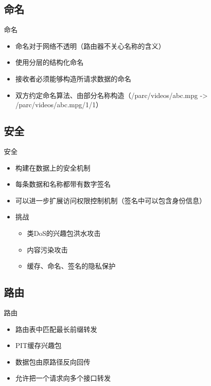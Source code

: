 \documentclass[mathserif]{beamer}
\begin{document}
\subsection{命名}
\begin{frame}{命名}
  \begin{itemize}
  \item 命名对于网络不透明（路由器不关心名称的含义）
  \item 使用分层的结构化命名
  \item 接收者必须能够构造所请求数据的命名
  \item 双方约定命名算法、由部分名称构造（/parc/videos/abc.mpg -> /parc/videos/abc.mpg/1/1）
  \end{itemize}
\end{frame}

\subsection{安全}
\begin{frame}{安全}
  \begin{itemize}
  \item 构建在数据上的安全机制
  \item 每条数据和名称都带有数字签名
  \item 可以进一步扩展访问权限控制机制（签名中可以包含身份信息）
  \item 挑战
    \begin{itemize}
    \item 类DoS的兴趣包洪水攻击
    \item 内容污染攻击
    \item 缓存、命名、签名的隐私保护
    \end{itemize}
  \end{itemize}
\end{frame}

\subsection{路由}
\begin{frame}{路由}
  \begin{itemize}
    \item 路由表中匹配最长前缀转发
    \item PIT缓存兴趣包
    \item 数据包由原路径反向回传
    \item 允许把一个请求向多个接口转发
  \end{itemize}
\end{frame}
\end{document}
